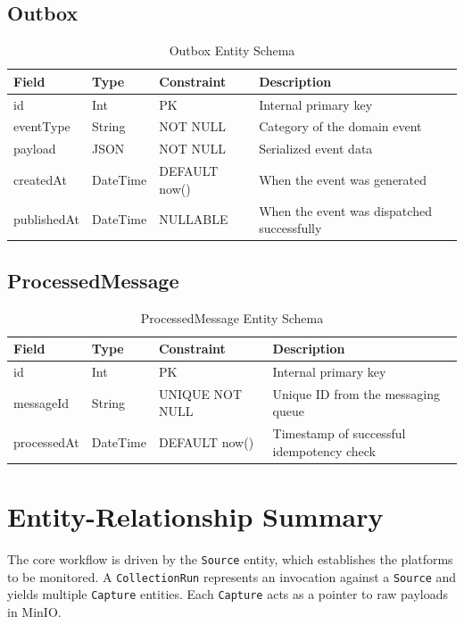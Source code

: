 \subsection{Outbox}
\begin{table}[htpb]
\centering
\begin{tabular}{lllp{6cm}}
\toprule
\textbf{Field} & \textbf{Type} & \textbf{Constraint} & \textbf{Description} \\
\midrule
id & Int & PK & Internal primary key \\
eventType & String & NOT NULL & Category of the domain event \\
payload & JSON & NOT NULL & Serialized event data \\
createdAt & DateTime & DEFAULT now() & When the event was generated \\
publishedAt & DateTime & NULLABLE & When the event was dispatched successfully \\
\bottomrule
\end{tabular}
\caption{Outbox Entity Schema}
\end{table}

\subsection{ProcessedMessage}
\begin{table}[htpb]
\centering
\begin{tabular}{lllp{6cm}}
\toprule
\textbf{Field} & \textbf{Type} & \textbf{Constraint} & \textbf{Description} \\
\midrule
id & Int & PK & Internal primary key \\
messageId & String & UNIQUE NOT NULL & Unique ID from the messaging queue \\
processedAt & DateTime & DEFAULT now() & Timestamp of successful idempotency check \\
\bottomrule
\end{tabular}
\caption{ProcessedMessage Entity Schema}
\end{table}

\section{Entity-Relationship Summary}
The core workflow is driven by the \texttt{Source} entity, which establishes the platforms to be monitored. A \texttt{CollectionRun} represents an invocation against a \texttt{Source} and yields multiple \texttt{Capture} entities. Each \texttt{Capture} acts as a pointer to raw payloads in MinIO. 


